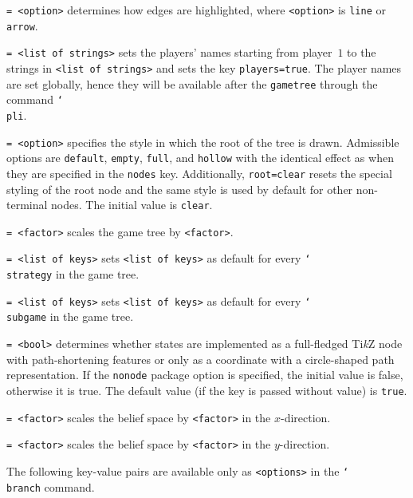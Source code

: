 \documentclass{article}
\newenvironment{desc}{\itemize[leftmargin=50pt]}{\enditemize}
\def\option#1#2{\item[\texttt{#1}] \hskip-1.5pt\texttt{#2}}
\renewcommand{\textbackslash}{\char`\\}
\def\cmd#1{\texttt{\color{cmd}\textbackslash#1}}
\def\TikZ{Ti\emph{k}Z\xspace}
\begin{document}
\begin{desc}
\option{path}{= <option>} determines how edges are highlighted, where \texttt{<option>} is \texttt{line} or \texttt{arrow}. 

\option{player names}{= <list of strings>} sets the players' names starting from player~$1$ to the strings in \texttt{<list of strings>} and sets the key \texttt{players=true}. The player names are set globally, hence they will be available after the \texttt{gametree} through the command \cmd{pli}.

\option{root}{= <option>} specifies the style in which the root of the tree is drawn. Admissible options are \texttt{default}, \texttt{empty}, \texttt{full}, and \texttt{hollow} with the identical effect as when they are specified in the \texttt{nodes} key. Additionally, \texttt{root=clear} resets the special styling of the root node and the same style is used by default for other non-terminal nodes. The initial value is \texttt{clear}.

\option{scale}{= <factor>} scales the game tree by \texttt{<factor>}.

\option{strategy}{= <list of keys>} sets \texttt{<list of keys>} as default for every \cmd{strategy} in the game tree.

\option{subgame}{= <list of keys>} sets \texttt{<list of keys>} as default for every \cmd{subgame} in the game tree.

\option{tikz nodes}{= <bool>} determines whether states are implemented as a full-fledged \TikZ node with path-shortening features or only as a coordinate with a circle-shaped path representation. If the \texttt{nonode} package option is specified, the initial value is false, otherwise it is true. The default value (if the key is passed without value) is \texttt{true}.

\option{xscale}{= <factor>} scales the belief space by \texttt{<factor>} in the $x$-direction.

\option{yscale}{= <factor>} scales the belief space by \texttt{<factor>} in the $y$-direction.
\end{desc}


\noindent The following key-value pairs are available only as \texttt{<options>} in the \cmd{branch} command.
\end{document}

